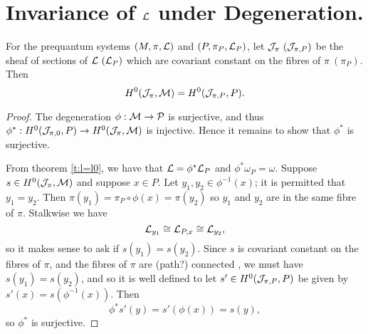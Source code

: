 \section{Invariance of $\mathcal{L}$ under Degeneration.}
	\begin{theorem}
		For the prequantum systems $(M,\pi,\mathcal{L})$ and $(P,\pi_{P}, \mathcal{L}_P)$, let $\mathcal{J}_\pi ~(\mathcal{J}_{\pi,P})$ be the sheaf of sections of $\mathcal{L} ~(\mathcal{L}_P)$ which are covariant constant on the fibres of $\pi ~(\pi_P)$. Then
		\begin{equation}
			H^0(\mathcal{J}_\pi, \mathcal{M}) = H^0(\mathcal{J}_{\pi,P}, P).
		\end{equation}
	\end{theorem}
	\begin{proof}
		The degeneration $\phi:\mathcal{M}\to\mathcal{P}$ is surjective, and thus $\phi^\ast:H^0(\mathcal{J}_{\pi,0},P) \to H^0(\mathcal{J}_\pi,\mathcal{M})$ is injective. Hence it remains to show that $\phi^\ast$ is surjective.
		\smallskip
		
		From theorem \ref{t:l=l0}, we have that $\mathcal{L}=\phi^\ast \mathcal{L}_P$ and $\phi^\ast \omega_P = \omega$. Suppose $s\in H^0(\mathcal{J}_{\pi},\mathcal{M})$ and suppose $x \in P$. Let $y_1,y_2 \in \phi^{-1}(x)$; it is permitted that $y_1=y_2$. Then $\pi(y_1) = \pi_P\circ \phi(x) = \pi(y_2)$ so $y_1$ and $y_2$ are in the same fibre of $\pi$. Stalkwise we have
		\begin{equation}
			\mathcal{L}_{y_1} \cong \mathcal{L}_{P,x} \cong \mathcal{L}_{y_2},
		\end{equation} 
		so it makes sense to ask if $s(y_1) = s(y_2)$. Since $s$ is covariant constant on the fibres of $\pi$, and the fibres of $\pi$ are (path?) connected \cite[thm 2.5]{jeffrey_bohr-sommerfeld_1992}, we must have $s(y_1)=s(y_2)$, and so it is well defined to let $s'\in H^0(\mathcal{J}_{\pi,P},P)$ be given by $s'(x) = s\left(\phi^{-1}(x)\right)$. Then
		\begin{equation}
			\phi^\ast s'(y) = s'(\phi(x)) = s(y),
		\end{equation}
		so $\phi^\ast$ is surjective.
		\end{proof}
	
	
	
		
	